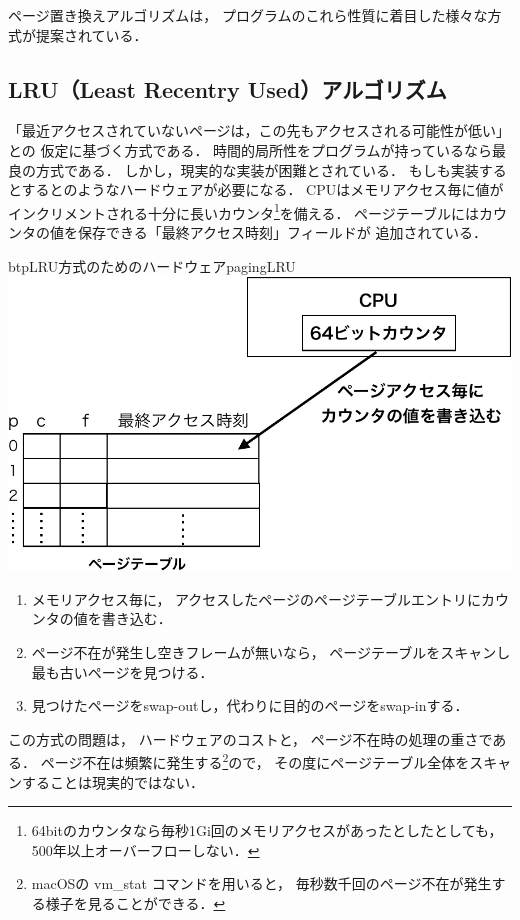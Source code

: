 ページ置き換えアルゴリズムは，
プログラムのこれら性質に着目した様々な方式が提案されている．

\subsection{LRU（Least Recentry Used）アルゴリズム}
「最近アクセスされていないページは，この先もアクセスされる可能性が低い」との
仮定に基づく方式である．
時間的局所性をプログラムが持っているなら最良の方式である．
しかし，現実的な実装が困難とされている．
もしも実装するとするとのようなハードウェアが必要になる．
CPUはメモリアクセス毎に値がインクリメントされる十分に長いカウンタ\footnote{
64bitのカウンタなら毎秒1Gi回のメモリアクセスがあったとしたとしても，
500年以上オーバーフローしない．
}を備える．
ページテーブルにはカウンタの値を保存できる「最終アクセス時刻」フィールドが
追加されている．

\begin{myfig}{btp}{LRU方式のためのハードウェア}{pagingLRU}
  \includegraphics[scale=0.66]{Fig/pagingLRU-crop.pdf}
\end{myfig}

\begin{enumerate}
\item メモリアクセス毎に，
  アクセスしたページのページテーブルエントリにカウンタの値を書き込む．
\item ページ不在が発生し空きフレームが無いなら，
  ページテーブルをスキャンし最も古いページを見つける．
\item 見つけたページをswap-outし，代わりに目的のページをswap-inする．
\end{enumerate}

この方式の問題は，
ハードウェアのコストと，
ページ不在時の処理の重さである．
ページ不在は頻繁に発生する\footnote{
macOSの vm\_stat コマンドを用いると，
毎秒数千回のページ不在が発生する様子を見ることができる．}ので，
その度にページテーブル全体をスキャンすることは現実的ではない．


